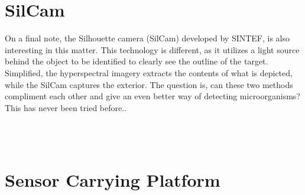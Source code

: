 \section{SilCam}
On a final note, the Silhouette camera (SilCam) developed by SINTEF, is also interesting in this matter. This technology is different, as it utilizes a light source behind the object to be identified to clearly see the outline of the target. Simplified, the hyperspectral imagery extracts the contents of what is depicted, while the SilCam captures the exterior. The question is, can these two methods compliment each other and give an even better way of detecting microorganisms? This has never been tried before..


\\\\
\section{Sensor Carrying Platform}
